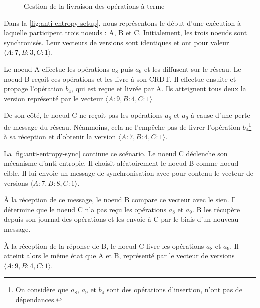 \begin{figure}[!ht]
{\begin{minipage}{\linewidth}
{
        \label{fig:anti-entropy-sync}
      }
    \end{minipage}
  }
  \caption{Gestion de la livraison des opérations à terme}
  \label{fig:anti-entropy}
\end{figure}

Dans la \autoref{fig:anti-entropy-setup}, nous représentons le début d'une exécution à laquelle participent trois noeuds : A, B et C.
Initialement, les trois noeuds sont synchronisés.
Leur vecteurs de versions sont identiques et ont pour valeur $\langle A:7,B:3,C:1 \rangle$.

Le noeud A effectue les opérations $a_8$ puis $a_9$ et les diffusent sur le réseau.
Le noeud B reçoit ces opérations et les livre à son \ac{CRDT}.
Il effectue ensuite et propage l'opération $b_4$, qui est reçue et livrée par A.
Ils atteignent tous deux la version représenté par le vecteur $\langle A:9,B:4,C:1 \rangle$

De son côté, le noeud C ne reçoit pas les opérations $a_8$ et $a_9$ à cause d'une perte de message du réseau.
Néanmoins, cela ne l'empêche pas de livrer l'opération $b_4$\footnote{On considère que $a_8$, $a_9$ et $b_4$ sont des opérations d'insertion, \ie n'ont pas de dépendances.} à sa réception et d'obtenir la version $\langle A:7,B:4,C:1 \rangle$.

La \autoref{fig:anti-entropy-sync} continue ce scénario.
Le noeud C déclenche son mécanisme d'anti-entropie.
Il choisit aléatoirement le noeud B comme noeud cible.
Il lui envoie un message de synchronisation avec pour contenu le vecteur de versions $\langle A:7,B:8,C:1 \rangle$.

À la réception de ce message, le noeud B compare ce vecteur avec le sien.
Il détermine que le noeud C n'a pas reçu les opérations $a_8$ et $a_9$.
B les récupère depuis son journal des opérations et les envoie à C par le biais d'un nouveau message.

À la réception de la réponse de B, le noeud C livre les opérations $a_8$ et $a_9$.
Il atteint alors le même état que A et B, représenté par le vecteur de versions $\langle A:9,B:4,C:1 \rangle$.\\

